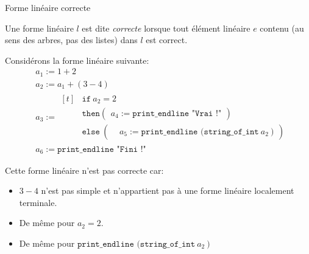 \begin{definition}
    \label{definition_forme_lineaire_correcte}
    Forme linéaire correcte

    Une forme linéaire $l$ est dite \textit{correcte} lorsque tout élément
    linéaire $e$ contenu (au sens des arbres, pas des listes) dans $l$ est
    correct.
\end{definition}

\begin{example}
    Considérons la forme linéaire suivante:
    \begin{align*}
         & a_1 := 1 + 2                            \\
         & a_2 := a_1 + (3 - 4)                    \\
         & a_3 :=
        \begin{aligned}[t]
             & \texttt{if}\ a_2 = 2  \\
             & \texttt{then} \left(
            \begin{aligned}
                    a_4 := \texttt{print\_endline "Vrai !"}
                \end{aligned}
            \right)\                 \\
             & \texttt{else}\ \left(
            \begin{aligned}
                     & a_5 := \texttt{print\_endline (string\_of\_int}\ a_2\ \texttt{)}
                \end{aligned}
            \right)
        \end{aligned}                  \\
         & a_6 := \texttt{print\_endline "Fini !"}
    \end{align*}

    Cette forme linéaire n'est pas correcte car:
    \begin{itemize}
        \item $3 - 4$ n'est pas simple et n'appartient pas à une forme linéaire
              localement terminale.
        \item De même pour $a_2 = 2$.
        \item De même pour $\texttt{print\_endline (string\_of\_int}\ a_2\ \texttt{)}$
    \end{itemize}

    \bigbreak


\end{example}
